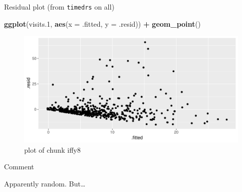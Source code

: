 \documentclass[ignorenonframetext,]{beamer}
\newenvironment{Shaded}{\begin{snugshade}}{\end{snugshade}}
\newcommand{\DataTypeTok}[1]{\textcolor[rgb]{0.13,0.29,0.53}{#1}}
\newcommand{\FloatTok}[1]{\textcolor[rgb]{0.00,0.00,0.81}{#1}}
\newcommand{\KeywordTok}[1]{\textcolor[rgb]{0.13,0.29,0.53}{\textbf{#1}}}
\newcommand{\NormalTok}[1]{#1}
\newcommand{\OperatorTok}[1]{\textcolor[rgb]{0.81,0.36,0.00}{\textbf{#1}}}
\newcommand{\StringTok}[1]{\textcolor[rgb]{0.31,0.60,0.02}{#1}}
\begin{document}
\begin{frame}[fragile]{Residual plot (from \texttt{timedrs} on all)}
\protect\hypertarget{residual-plot-from-timedrs-on-all}{}

\begin{Shaded}
\begin{Highlighting}[]
\KeywordTok{ggplot}\NormalTok{(visits}\FloatTok{.1}\NormalTok{, }\KeywordTok{aes}\NormalTok{(}\DataTypeTok{x =}\NormalTok{ .fitted, }\DataTypeTok{y =}\NormalTok{ .resid)) }\OperatorTok{+}\StringTok{ }\KeywordTok{geom_point}\NormalTok{()}
\end{Highlighting}
\end{Shaded}

\begin{figure}
\centering
\includegraphics{figure/iffy8-1.pdf}
\caption{plot of chunk iffy8}
\end{figure}

\end{frame}

\begin{frame}{Comment}
\protect\hypertarget{comment}{}

Apparently random. But\ldots

\end{frame}
\end{document}
